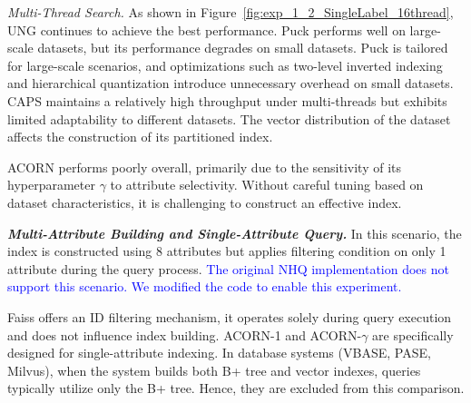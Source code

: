 \documentclass[sigconf, nonacm]{acmart}
\begin{document}
	\textit{Multi-Thread Search.}
	As shown in Figure~\ref{fig:exp_1_2_SingleLabel_16thread}, UNG continues to achieve the best performance. Puck performs well on large-scale datasets, but its performance degrades on small datasets. Puck is tailored for large-scale scenarios, and optimizations such as two-level inverted indexing and hierarchical quantization introduce unnecessary overhead on small datasets. 
	CAPS maintains a relatively high throughput under multi-threads but exhibits limited adaptability to different datasets. The vector distribution of the dataset affects the construction of its partitioned index.
	
	ACORN performs poorly overall, primarily due to the sensitivity of its hyperparameter $\gamma$ to attribute selectivity. Without careful tuning based on dataset characteristics, it is challenging to construct an effective index.
	
	\textit{\textbf{Multi-Attribute Building and Single-Attribute Query.}}
	In this scenario, the index is constructed using 8 attributes but applies filtering condition on only 1 attribute during the query process.
	\textcolor{blue}{The original NHQ implementation does not support this scenario. We modified the code to enable this experiment.}
	
	 Faiss offers an ID filtering mechanism, it operates solely during query execution and does not influence index building. ACORN-1 and ACORN-\(\gamma\) are specifically designed for single-attribute indexing. In database systems (VBASE, PASE, Milvus), when the system builds both B+ tree and vector indexes, queries typically utilize only the B+ tree. Hence, they are excluded from this comparison.
	
\end{document}
